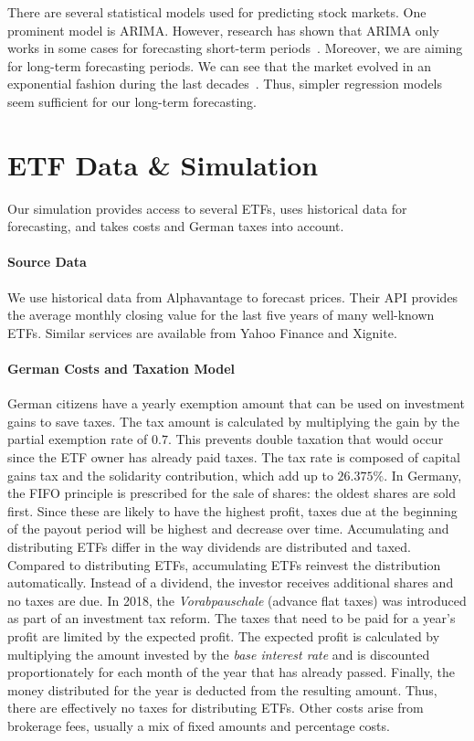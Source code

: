 \documentclass[sigconf%
,natbib=true%
]{acmart}
\begin{document}
There are several statistical models used for predicting stock markets. 
One prominent model is ARIMA.
However, research has shown that ARIMA only works in some cases for forecasting short-term periods~\cite{angadi2015-time, Cheng2020ApplicationOA, Mohamedashik2019StatisticalTF}. Moreover, we are aiming for long-term forecasting periods.
We can see that the market evolved in an exponential fashion during the last decades~\cite{leippold2016-index}. 
Thus, simpler regression models seem sufficient for our long-term forecasting.

\section{ETF Data \& Simulation}
Our simulation provides access to several ETFs, uses historical data for forecasting, and takes costs and German taxes into account.

\paragraph{Source Data}
We use historical data from Alphavantage to forecast prices.
Their API provides the average monthly closing value for the last five years of many well-known ETFs. 
Similar services are available from Yahoo Finance and Xignite.

\paragraph{German Costs and Taxation Model}
German citizens have a yearly exemption amount that can be used on investment gains to save taxes.
The tax amount is calculated by multiplying the gain by the partial exemption rate of $0.7$.
This prevents double taxation that would occur since the ETF owner has already paid taxes.
The tax rate is composed of capital gains tax and the solidarity contribution, which add up to $26.375\%$.
In Germany, the FIFO principle is prescribed for the sale of shares: the oldest shares are sold first. 
Since these are likely to have the highest profit, taxes due at the beginning of the payout period will be highest and decrease over time.
Accumulating and distributing ETFs differ in the way dividends are distributed and taxed.
Compared to distributing ETFs, accumulating ETFs reinvest the distribution automatically.
Instead of a dividend, the investor receives additional shares and no taxes are due. 
In 2018, the \emph{Vorabpauschale} (advance flat taxes) was introduced as part of an investment tax reform.
The taxes that need to be paid for a year's profit are limited by the expected profit. 
The expected profit is calculated by multiplying the amount invested by the \emph{base interest rate} and is discounted proportionately for each month of the year that has already passed.
Finally, the money distributed for the year is deducted from the resulting amount.
Thus, there are effectively no taxes for distributing ETFs.
Other costs arise from brokerage fees, usually a mix of fixed amounts and percentage costs.
\end{document}
